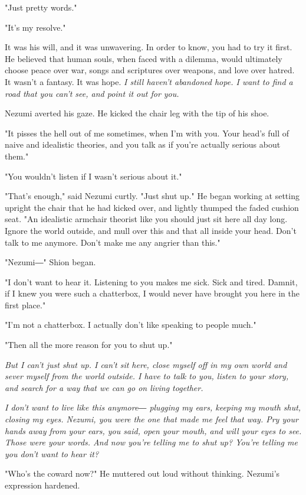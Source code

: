 "Just pretty words."

"It's my resolve."

It was his will, and it was unwavering. In order to know, you had to try
it first. He believed that human souls, when faced with a dilemma, would
ultimately choose peace over war, songs and scriptures over weapons, and
love over hatred. It wasn't a fantasy. It was hope. \emph{I still haven't
abandoned hope. I want to find a road that you can't see, and point it
out for you.}

Nezumi averted his gaze. He kicked the chair leg with the tip of his
shoe.

"It pisses the hell out of me sometimes, when I'm with you. Your head's
full of naive and idealistic theories, and you talk as if you're
actually serious about them."

"You wouldn't listen if I wasn't serious about it."

"That's enough," said Nezumi curtly. "Just shut up." He began working at
setting upright the chair that he had kicked over, and lightly thumped
the faded cushion seat. "An idealistic armchair theorist like you should
just sit here all day long. Ignore the world outside, and mull over this
and that all inside your head. Don't talk to me anymore. Don't make me
any angrier than this."

"Nezumi―" Shion began.

"I don't want to hear it. Listening to you makes me sick. Sick and
tired. Damnit, if I knew you were such a chatterbox, I would never have
brought you here in the first place."

"I'm not a chatterbox. I actually don't like speaking to people much."

"Then all the more reason for you to shut up."

\emph{But I can't just shut up. I can't sit here, close myself off in my own
world and sever myself from the world outside. I have to talk to you,
listen to your story, and search for a way that we can go on living
together.}

\emph{I don't want to live like this anymore― plugging my ears, keeping my
mouth shut, closing my eyes. Nezumi, you were the one that made me feel
that way. Pry your hands away from your ears, you said, open your mouth,
and will your eyes to see. Those were your words. And now you're telling
me to shut up? You're telling me you don't want to hear it?}

"Who's the coward now?" He muttered out loud without thinking. Nezumi's
expression hardened.

